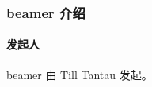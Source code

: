 \documentclass{ctexbeamer}
\begin{document}
    \begin{frame}
        \frametitle{beamer 介绍}
        \framesubtitle{发起人}
        beamer 由 Till Tantau 发起。
    \end{frame}
\end{document}
